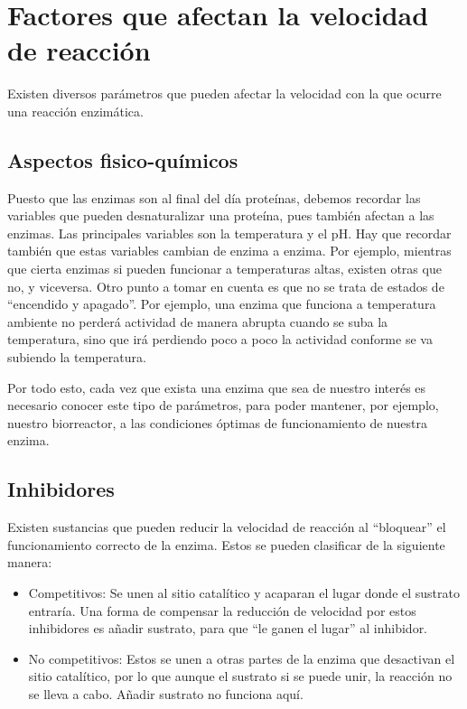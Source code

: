 \section{Factores que afectan la velocidad de reacción}

Existen diversos parámetros que pueden afectar la velocidad con la que ocurre una reacción enzimática.

\subsection{Aspectos fisico-químicos}

Puesto que las enzimas son al final del día proteínas, debemos recordar las variables que pueden desnaturalizar una proteína, pues también afectan a las enzimas. Las principales variables son la temperatura y el pH. Hay que recordar también que estas variables cambian de enzima a enzima. Por ejemplo, mientras que cierta enzimas si pueden funcionar a temperaturas altas, existen otras que no, y viceversa. Otro punto a tomar en cuenta es que no se trata de estados de ``encendido y apagado''. Por ejemplo, una enzima que funciona a temperatura ambiente no perderá actividad de manera abrupta cuando se suba la temperatura, sino que irá perdiendo poco a poco la actividad conforme se va subiendo la temperatura.

Por todo esto, cada vez que exista una enzima que sea de nuestro interés es necesario conocer este tipo de parámetros, para poder mantener, por ejemplo, nuestro biorreactor, a las condiciones óptimas de funcionamiento de nuestra enzima.

\subsection{Inhibidores}

Existen sustancias que pueden reducir la velocidad de reacción al ``bloquear'' el funcionamiento correcto de la enzima. Estos se pueden clasificar de la siguiente manera:

\begin{itemize}
    \item Competitivos: Se unen al sitio catalítico y acaparan el lugar donde el sustrato entraría. Una forma de compensar la reducción de velocidad por estos inhibidores es añadir sustrato, para que ``le ganen el lugar'' al inhibidor.
    \item No competitivos: Estos se unen a otras partes de la enzima que desactivan el sitio catalítico, por lo que aunque el sustrato si se puede unir, la reacción no se lleva a cabo. Añadir sustrato no funciona aquí.
\end{itemize}

